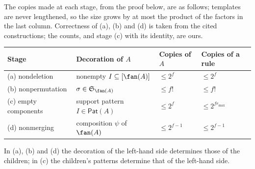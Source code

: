 The copies made at each stage, from the proof below, are as follows; templates
are never lengthened, so the size grows by at most the product of the factors in
the last column.  Correctness of (a), (b) and (d) is taken from the cited
constructions; the counts, and stage (c) with its identity, are ours.
\begin{center}
\footnotesize
\setlength{\tabcolsep}{4pt}
\renewcommand{\arraystretch}{1.15}
\begin{tabular}{@{}llll@{}}
\hline
Stage & Decoration of $A$ & Copies of $A$ & Copies of a rule\\
\hline
(a) nondeletion & nonempty $I\subseteq[\fan(A)]$ & $\le2^f$ & $\le2^f$\\
(b) nonpermutation & $\sigma\in\mathfrak S_{\fan(A)}$ & $\le f!$ & $\le f!$\\
(c) empty components & support pattern $I\in\mathsf{Pat}(A)$ & $\le2^f$ & $\le2^{fr_{\max}}$\\
(d) nonmerging & composition $\psi$ of $\fan(A)$ & $\le2^{f-1}$ & $\le2^{f-1}$\\
\hline
\end{tabular}
\end{center}
In (a), (b) and (d) the decoration of the left-hand side determines those of the
children; in (c) the children's patterns determine that of the left-hand side.

